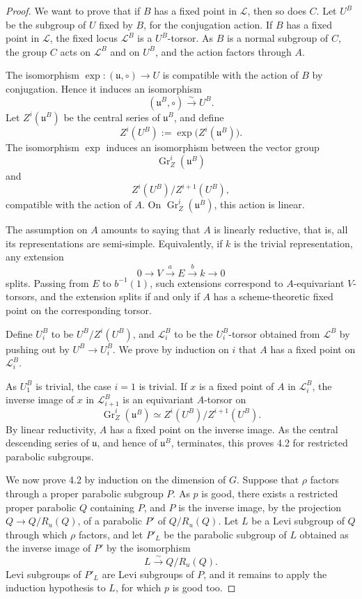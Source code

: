 \documentclass[11pt]{article}
\begin{document}
\begin{proof}
We want to prove that if \(B\) has a fixed point in \(\mathcal L\), then so does
\(C\). Let \(U^B\) be the subgroup of \(U\) fixed by \(B\), for the conjugation
action. If \(B\) has a fixed point in \(\mathcal L\), the fixed locus
\(\mathcal L^B\) is a \(U^B\)-torsor. As \(B\) is a normal subgroup of \(C\), the
group \(C\) acts on \(\mathcal L^B\) and on \(U^B\), and the action factors
through \(A\).

The isomorphism \(\exp:(\mathfrak u,\circ)\to U\) is compatible with the action
of \(B\) by conjugation. Hence it induces an isomorphism
\[
  (\mathfrak u^B,\circ)\xrightarrow{\sim}U^B.
\]
Let \(Z^i(\mathfrak u^B)\) be the central series of \(\mathfrak u^B\), and define
\[
  Z^i(U^B):=\exp\bigl(Z^i(\mathfrak u^B)\bigr).
\]
The isomorphism \(\exp\) induces an isomorphism between the vector group
\[
  \operatorname{Gr}_{Z}^{i}(\mathfrak u^B)
\]
and
\[
  Z^i(U^B)/Z^{i+1}(U^B),
\]
compatible with the action of \(A\). On
\(\operatorname{Gr}_{Z}^{i}(\mathfrak u^B)\), this action is linear.

The assumption on \(A\) amounts to saying that \(A\) is linearly reductive, that
is, all its representations are semi-simple. Equivalently, if \(k\) is the trivial
representation, any extension
\begin{equation}
  0\longrightarrow V\stackrel{a}{\longrightarrow}E
  \stackrel{b}{\longrightarrow}k\longrightarrow 0
  \tag{4.2.3}
\end{equation}
splits. Passing from \(E\) to \(b^{-1}(1)\), such extensions correspond to
\(A\)-equivariant \(V\)-torsors, and the extension splits if and only if \(A\) has
a scheme-theoretic fixed point on the corresponding torsor.

Define \(U_i^B\) to be \(U^B/Z^i(U^B)\), and \(\mathcal L_i^B\) to be the
\(U_i^B\)-torsor obtained from \(\mathcal L^B\) by pushing out by
\(U^B\to U_i^B\). We prove by induction on \(i\) that \(A\) has a fixed point on
\(\mathcal L_i^B\).

As \(U_1^B\) is trivial, the case \(i=1\) is trivial. If \(x\) is a fixed point of
\(A\) in \(\mathcal L_i^B\), the inverse image of \(x\) in \(\mathcal L_{i+1}^B\)
is an equivariant \(A\)-torsor on
\[
  \operatorname{Gr}_{Z}^{i}(\mathfrak u^B)
  \simeq Z^i(U^B)/Z^{i+1}(U^B).
\]
By linear reductivity, \(A\) has a fixed point on the inverse image. As the central
descending series of \(\mathfrak u\), and hence of \(\mathfrak u^B\), terminates,
this proves 4.2 for restricted parabolic subgroups.

We now prove 4.2 by induction on the dimension of \(G\). Suppose that \(\rho\)
factors through a proper parabolic subgroup \(P\). As \(p\) is good, there exists
a restricted proper parabolic \(Q\) containing \(P\), and \(P\) is the inverse image,
by the projection \(Q\to Q/R_u(Q)\), of a parabolic \(P'\) of \(Q/R_u(Q)\). Let
\(L\) be a Levi subgroup of \(Q\) through which \(\rho\) factors, and let \(P'_L\) be
the parabolic subgroup of \(L\) obtained as the inverse image of \(P'\) by the
isomorphism
\[
  L\xrightarrow{\sim} Q/R_u(Q).
\]
Levi subgroups of \(P'_L\) are Levi subgroups of \(P\), and it remains to apply the
induction hypothesis to \(L\), for which \(p\) is good too.
\end{proof}
\end{document}
